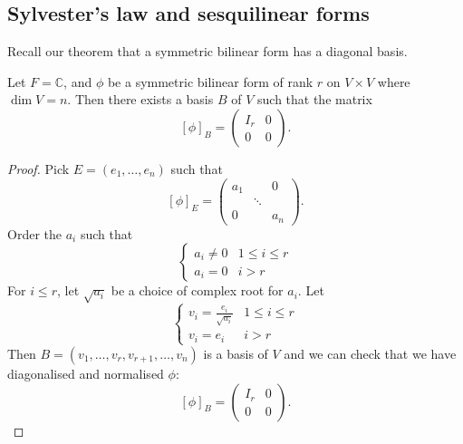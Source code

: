 \documentclass[a4paper]{scrartcl}
\begin{document}
\subsection{Sylvester's law and sesquilinear forms}
Recall our theorem that a symmetric bilinear form has a diagonal basis.

\begin{corollary}
    Let $F=\mathbb{C}$, and $\phi$ be a symmetric bilinear form of rank $r$ on $V \times V$ where $\operatorname{dim}V=n$. Then there exists a basis $B$ of $V$ such that the matrix 
    \[[\phi]_B=\left(
    \begin{array}{c|c}
     I_r &0\\
     \hline
     0&0
     \end{array}
     \right).\]
\end{corollary}
\begin{proof}
     Pick $E=(e_1, \ldots , e_n)$ such that 
     \[[\phi]_E=
     \begin{pmatrix}
     a_1&&0\\ &\ddots&\\ 0&&a_n
     \end{pmatrix}
     .\]
     Order the $a_i$ such that 
     \begin{equation*}
          \begin{cases}
              a_i \neq 0 & 1 \leq i \leq r\\
              a_i=0 & i>r
          \end{cases}
     \end{equation*}
     For $i \leq r$, let $\sqrt{a_i}$ be a choice of complex root for $a_i$. Let 
     \begin{equation*}
        \begin{cases}
            v_i=\frac{e_i}{\sqrt{a_i}} & 1 \leq i \leq r\\
            v_i=e_i& i>r
        \end{cases}
   \end{equation*}
   Then $B= (v_1, \ldots ,v_r, v_{r+1}, \ldots , v_n)$ is a basis of $V$ and we can check that we have diagonalised and normalised $\phi$:
   \[[\phi]_B=\left(
     \begin{array}{c|c}
      I_r &0\\
      \hline
      0&0
      \end{array}
      \right).\]
\end{proof}
\end{document}
